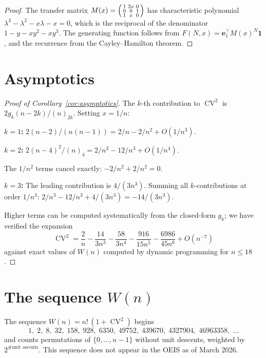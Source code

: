\documentclass[11pt]{amsart}
\theoremstyle{definition}
\DeclareMathOperator{\CV}{CV}
\begin{document}
\begin{proof}
The transfer matrix $M(x) = \begin{psmallmatrix} 1 & 2x & 0 \\ 0 & 0 & 1 \\ 1 & x & 0 \end{psmallmatrix}$ has characteristic polynomial $\lambda^3 - \lambda^2 - x\lambda - x = 0$, which is the reciprocal of the denominator $1 - y - xy^2 - xy^3$. The generating function follows from $F(N,x) = \mathbf{e}_1^\top M(x)^N \mathbf{1}$, and the recurrence from the Cayley--Hamilton theorem.
\end{proof}

\section{Asymptotics}

\begin{proof}[Proof of Corollary~\ref{cor:asymptotics}]
The $k$-th contribution to $\CV^2$ is $2g_k(n-2k)/(n)_{2k}$. Setting $x = 1/n$:

\textbf{$k=1$:} $2(n-2)/(n(n-1)) = 2/n - 2/n^2 + O(1/n^3)$.

\textbf{$k=2$:} $2(n-4)^2/(n)_4 = 2/n^2 - 12/n^3 + O(1/n^4)$.

The $1/n^2$ terms cancel exactly: $-2/n^2 + 2/n^2 = 0$.

\textbf{$k=3$:} The leading contribution is $4/(3n^3)$. Summing all $k$-contributions at order $1/n^3$: $2/n^3 - 12/n^3 + 4/(3n^3) = -14/(3n^3)$.

Higher terms can be computed systematically from the closed-form $g_k$; we have verified the expansion
\[
\CV^2 = \frac{2}{n} - \frac{14}{3n^3} - \frac{58}{3n^4} - \frac{916}{15n^5} - \frac{6986}{45n^6} + O(n^{-7})
\]
against exact values of $W(n)$ computed by dynamic programming for $n \leq 18$.
\end{proof}

\section{The sequence $W(n)$}

The sequence $W(n) = n!\,(1 + \CV^2)$ begins
\[
1,\; 2,\; 8,\; 32,\; 158,\; 928,\; 6350,\; 49752,\; 439670,\; 4327904,\; 46963358,\; \ldots
\]
and counts permutations of $\{0,\ldots,n-1\}$ without unit descents, weighted by $2^{\text{\#unit ascents}}$. This sequence does not appear in the OEIS as of March 2026.
\end{document}
